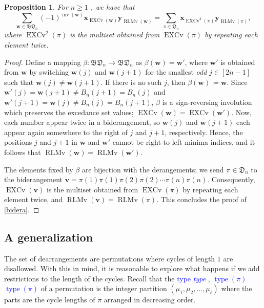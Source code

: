 \documentclass[reqno]{amsart}
\newtheorem{proposition}[theorem]{Proposition}
\theoremstyle{definition}
\newcommand{\defin}[1]{%
\relax\ifmmode%
\textcolor{blue}{#1}%
\else\textcolor{blue}{\emph{#1}}%
\fi%
}
\newcommand{\xvec}{\mathbf{x}}
\newcommand{\yvec}{\mathbf{y}}
\newcommand{\wvec}{\mathbf{w}}
\newcommand{\vvec}{\mathbf{v}}
\newcommand{\dArr}{\mathfrak{D}}
\newcommand{\bdArr}{\mathfrak{BD}}
\DeclareMathOperator{\inv}{inv}
\DeclareMathOperator{\type}{type}
\DeclareMathOperator{\EXCv}{EXCv}
\DeclareMathOperator{\RLMv}{RLMv}
\begin{document}
\begin{proposition}
For $n\geq 1$ , we have that 
\begin{equation}\label{bidera}
 \sum_{\wvec \in \bdArr_n} (-1)^{\inv(\wvec)} 
 \xvec_{\EXCv(\wvec)} \yvec_{\RLMv(\wvec)}
 = 
 \sum_{\pi \in \dArr_n} \xvec_{\EXCv^2(\pi)} \yvec_{\RLMv(\pi)},
\end{equation}
where $\EXCv^2(\pi)$ is the multiset obtained from $\EXCv(\pi)$ by repeating each element twice.
\end{proposition}
\begin{proof}
Define a mapping $\beta:\bdArr_n\to\bdArr_n$ as $\beta(\wvec)=\wvec'$, where $\wvec'$ is obtained
from $\wvec$ by switching $\wvec(j)$ and $\wvec(j+1)$ for the 
smallest \emph{odd} $j\in [2n-1]$ such that $\wvec(j) \neq \wvec(j+1)$.
If there is no such $j$, then $\beta(\wvec)\coloneqq\wvec$.
%
Since $\wvec'(j)=\wvec(j+1) \neq B_n(j+1) = B_n(j)$ and $\wvec'(j+1) = \wvec(j) \neq B_n(j)=B_n(j+1)$, 
$\beta$ is a sign-reversing involution which preserves
the excedance set values; $\EXCv(\wvec)=\EXCv(\wvec')$.
%
Now, each number appear twice in a biderangement,
so $\wvec(j)$ and $\wvec(j+1)$ each appear again somewhere to the right 
of $j$ and $j+1$, respectively.
Hence, the positions $j$ and $j+1$ in $\wvec$ and $\wvec'$
cannot be right-to-left minima indices, and it follows that 
$\RLMv(\wvec)=\RLMv(\wvec')$.

The elements fixed by $\beta$ are bijection with the derangements;
we send $\pi \in \dArr_n$ to the biderangement
$\vvec=\pi(1)\pi(1)\pi(2)\pi(2) \dotsb \pi(n)\pi(n)$.
Consequently, $\EXCv(\vvec)$ is the multiset obtained from 
$\EXCv(\pi)$ by repeating each element twice, 
and $\RLMv(\vvec)=\RLMv(\pi)$. This concludes the proof of \eqref{bidera}.
\end{proof}



\subsection{A generalization}

The set of dearrangements are permutations where cycles of length $1$
are disallowed. With this in mind, it is reasonable to explore what 
happens if we add restrictions to the length of the cycles.
Recall that the \defin{type}, \defin{$\type(\pi)$} of a permutation is the 
integer partition $(\mu_1,\mu_2,\dotsc,\mu_\ell)$
where the parts are the cycle lengths of $\pi$ arranged in decreasing order.
\end{document}
